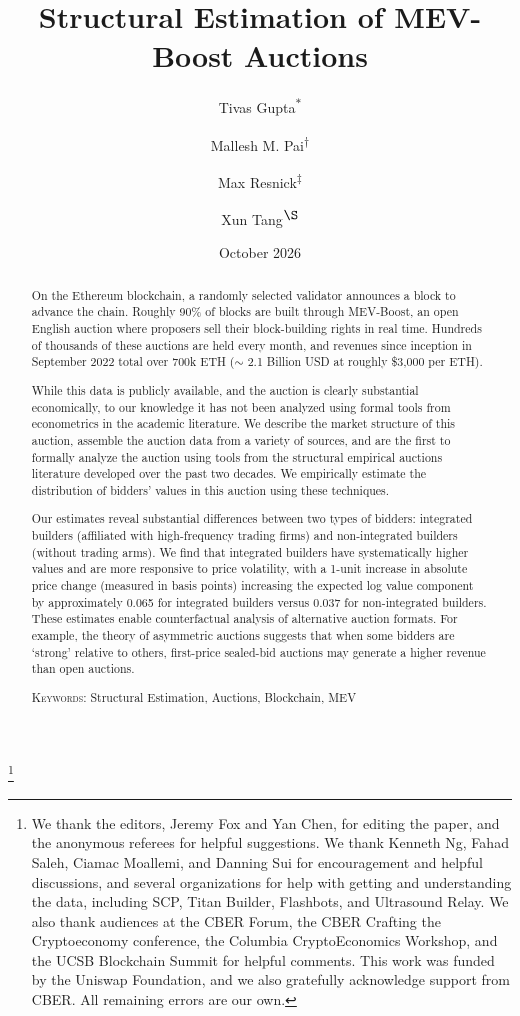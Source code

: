 \documentclass[12pt,reqno]{amsart}
\newcommand{\acknowledgementtext}{We thank the editors, Jeremy Fox and Yan Chen, for editing the paper, and the anonymous referees for helpful suggestions. We thank Kenneth Ng, Fahad Saleh, Ciamac Moallemi, and Danning Sui for encouragement and helpful discussions, and several organizations for help with getting and understanding the data, including SCP, Titan Builder, Flashbots, and Ultrasound Relay. We also thank audiences at the CBER Forum, the CBER Crafting the Cryptoeconomy conference, the Columbia CryptoEconomics Workshop, and the UCSB Blockchain Summit for helpful comments. This work was funded by the Uniswap Foundation, and we also gratefully acknowledge support from CBER. All remaining errors are our own.}
\begin{document}
\raggedbottom
\setlength{\emergencystretch}{2em}
\title{Structural Estimation of MEV-Boost Auctions}
\author[Gupta]{Tivas Gupta\textsuperscript{$\ast$}}
\address[\textsuperscript{$\ast$}]{Consensys Inc., \texttt{tivas.gupta@consensys.net}}
\author[Pai]{Mallesh M. Pai\textsuperscript{$\dagger$}}
\address[\textsuperscript{$\dagger$}]{Tempo Labs, \texttt{mallesh.pai@gmail.com} (corresponding author)}
\author[Resnick]{Max Resnick\textsuperscript{$\ddagger$}}
\address[\textsuperscript{$\ddagger$}]{Anza Labs, \texttt{resnick.max@gmail.com}}
\author[Tang]{Xun Tang\textsuperscript{$\S$}}
\address[\textsuperscript{$\S$}]{Department of Economics, Rice University, \texttt{xt9@rice.edu}}
\date{October 2026}
\thanks{\acknowledgementtext}
\begin{abstract}
On the Ethereum blockchain, a randomly selected validator announces a block to advance the chain. Roughly 90\% of blocks are built through MEV-Boost, an open English auction where proposers sell their block-building rights in real time. Hundreds of thousands of these auctions are held every month, and revenues since inception in September 2022 total over 700k ETH ($\sim$ 2.1 Billion USD at roughly \$3,000 per ETH).

While this data is publicly available, and the auction is clearly substantial economically, to our knowledge it has not been analyzed using formal tools from econometrics in the academic literature. We describe the market structure of this auction, assemble the auction data from a variety of sources, and are the first to formally analyze the auction using tools from the structural empirical auctions literature developed over the past two decades. We empirically estimate the distribution of bidders' values in this auction using these techniques. 

Our estimates reveal substantial differences between two types of bidders: integrated builders (affiliated with high-frequency trading firms) and non-integrated builders (without trading arms). We find that integrated builders have systematically higher values and are more responsive to price volatility, with a 1-unit increase in absolute price change (measured in basis points) increasing the expected log value component by approximately 0.065 for integrated builders versus 0.037 for non-integrated builders. These estimates enable counterfactual analysis of alternative auction formats. For example, the theory of asymmetric auctions suggests that when some bidders are `strong' relative to others, first-price sealed-bid auctions may generate a higher revenue than open auctions. 

\vspace{1em}
\noindent \textsc{Keywords:} Structural Estimation, Auctions, Blockchain, MEV


\end{abstract}
\end{document}
